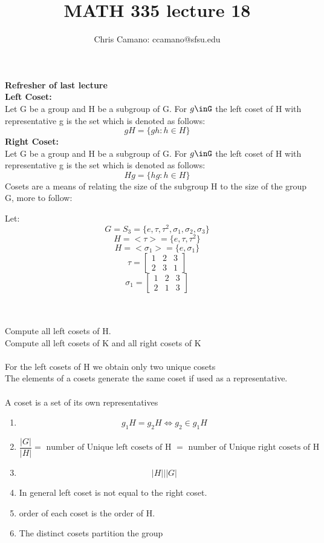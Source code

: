 \documentclass[11pt]{article}
\author{Chris Camano: ccamano@sfsu.edu}
\title{MATH 335  lecture 18 }
\date
\theoremstyle{definition}  %
\newcommand{\block}[2]{\begin{tcolorbox}[title={#1}]{#2}\end{tcolorbox}}
\begin{document}
\maketitle


\textbf{Refresher of last lecture}\\
\textbf{Left Coset:}\\
 Let G be a group and H be a subgroup of G. For $g\inG$ the left coset of H with representative g is the set which is denoted as follows:
\[
  gH=\{gh:h\in H\}
\]
\textbf{Right Coset:}\\
 Let G be a group and H be a subgroup of G. For $g\inG$ the left coset of H with representative g is the set which is denoted as follows:
\[
  Hg=\{hg:h\in H\}
\]
Cosets are a means of relating the size of the subgroup H to the size of the group G, more to follow:\\
\block{Original Example}{
Let: \[
  G=S_3=\{e,\tau,\tau^2,\sigma_1,\sigma_2,\sigma_3\}
\]
\[
  H=<\tau>=\{e,\tau,\tau^2\}
\]
\[
  H=<\sigma_1>=\{e,\sigma_1\}
\]
\[
\tau=
  \begin{bmatrix}
    1&2&3\\2&3&1
  \end{bmatrix}
\]
\[
\sigma_1=
  \begin{bmatrix}
    1&2&3\\2&1&3
  \end{bmatrix}
\]
}\\\\
Compute all left cosets of H. \\
Compute all left cosets of K and all right cosets of K\\
\\
For the left cosets of H we obtain only two unique cosets \\
The elements of a cosets generate the same coset if used as a representative. \\\\
A coset is a set of its own representatives\\
\block{Coset observations}{
\begin{enumerate}
  \item
  $$
  g_1H=g_2H \iff g_2 \in g_1H
  $$
  \item
  \[
    \frac{|G|}{|H|}=\text { number of Unique  left cosets of H }=\text { number of Unique right cosets of H }
  \]
  \item
  \[
    |H|||G|
  \]
  \item
  In general  left coset is not equal to the right coset.
  \item
  order of each coset is the order of H.
  \item The distinct cosets partition the group\\

\end{enumerate}




}
\end{document}
